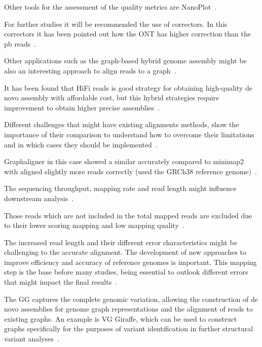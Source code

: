 \documentclass[12pt, letterpaper]{article}
\begin{document}

Other tools for the assessment of the quality metrics are NanoPlot~\cite{Mahmoud2025}.

For further studies it will be recommended the use of correctors. In this correctors it has been pointed out how the ONT has higher correction than the pb reads~\cite{Mahmoud2025}.

Other applications such as the graph-based hybrid genome assembly might be also an interesting approach to align reads to a graph~\cite{Mahmoud2025}.

It has been found that HiFi reads is good strategy for obtaining high-quality de novo assembly with affordable cost, but this hybrid strategies require improvement to obtain higher precise assemblies~\cite{Espinosa2023}. 

Different challenges that might have existing alignments methods, show the importance of their comparison to understand how to overcome their limitations and in which cases they should be implemented~\cite{vacmap2025}.

Graphaligner in this case showed a similar accurately compared to minimap2 with aligned slightly more reads correctly (used the GRCh38 reference genome)~\cite{Rautiainen2020}. 

The sequencing throughput, mapping rate and read length might influence downstream analysis~\cite{Wang2026}.

Those reads which are not included in the total mapped reads are excluded due to their lower scoring mapping and low mapping quality~\cite{Wilton2022}.


The increased read length and their different error characteristics might be challenging to the accurate alignment. The development of new approaches to improve efficiency and accuracy of reference genomes is important. This mapping step is the base before many studies, being essential to outlook different errors that might impact the final results~\cite{Mahmoud2025}.

The GG captures the complete genomic variation, allowing the construction of de novo assemblies for genome graph representations and the alignment of reads to existing graphs. An example is VG Giraffe, which can be used to construct graphs specifically for the purposes of variant identification in further structural variant analyses~\cite{Mahmoud2025}.
\end{document}
